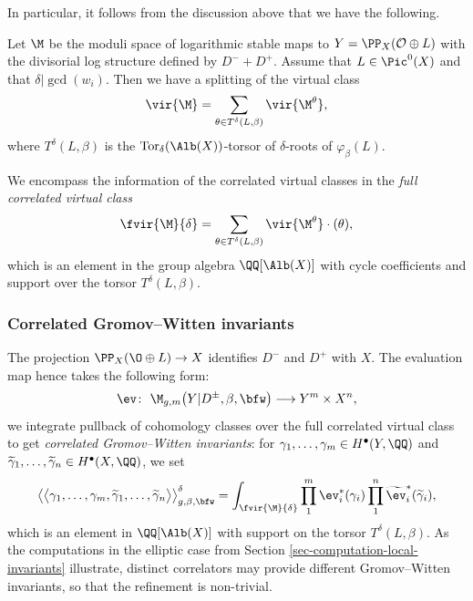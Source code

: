 In particular, it follows from the discussion above that we have the following.
\begin{prop}
 Let $\M$ be the moduli space of logarithmic stable maps to $Y=\PP_X(\mathcal O\oplus L)$ with the divisorial log structure defined by $D^- + D^+$. Assume that $L\in\Pic^0(X)$ and that $\delta|\gcd(w_i)$.
 Then we have a splitting of the virtual class
 \[ \vir{\M}=\sum_{\theta\in T^\delta(L,\beta)}\vir{\M^\theta},\]
 where $T^\delta(L,\beta)$ is the $\operatorname{Tor}_{\delta}(\Alb(X))$-torsor of $\delta$-roots of $\varphi_\beta(L)$.
\end{prop}

\begin{defi}\label{def:fullrefined}
We encompass the information of the correlated virtual classes in the \textit{full correlated virtual class}
\[ \fvir{\M}{\delta} = \sum_{\theta\in T^\delta(L,\beta)} \vir{\M^\theta}\cdot (\theta),\]
which is an element in the group algebra $\QQ[\Alb(X)]$ with cycle coefficients and support over the torsor $T^\delta(L,\beta)$.
\end{defi}

\subsubsection{Correlated Gromov--Witten invariants}
The projection $\PP_X(\O\oplus L)\to X$ identifies $D^-$ and $D^+$ with $X$. The evaluation map hence takes the following form:
\[
\ev\colon\ \M_{g,m}\bigl(Y|D^\pm,\beta,\bfw\bigr) \longrightarrow Y^m\times X^n,
 \]
we integrate pullback of cohomology classes over the full correlated virtual class to get \textit{correlated Gromov--Witten invariants}: for $\gamma_1,\dots,\gamma_m\in H^\bullet(Y,\QQ)$ and $\widetilde{\gamma}_1,\dots,\widetilde{\gamma}_n\in H^\bullet(X,\QQ)$, we set
\[ \bigl\langle\bigl\langle\gamma_1,\dots,\gamma_m,\widetilde{\gamma}_1,\dots,\widetilde{\gamma}_n\bigr\rangle\bigr\rangle^\delta_{g,\beta,\bfw} = \int_{\fvir{\M}{\delta}} \prod_1^m\ev_i^*(\gamma_i)\prod_1^n\widetilde{\ev}_i^*(\widetilde{\gamma}_i), \]
which is an element in $\QQ[\Alb(X)]$ with support on the torsor $T^\delta(L,\beta)$. As the computations in the elliptic case from Section \ref{sec-computation-local-invariants} illustrate, distinct correlators may provide different Gromov--Witten invariants, so that the refinement is non-trivial.






